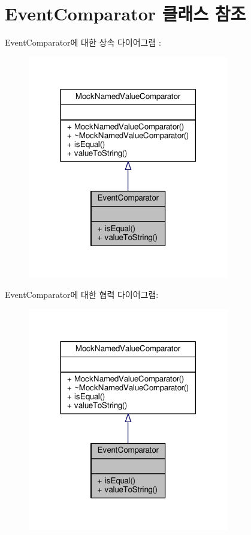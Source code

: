 \hypertarget{class_event_comparator}{}\section{Event\+Comparator 클래스 참조}
\label{class_event_comparator}


Event\+Comparator에 대한 상속 다이어그램 \+: 
\nopagebreak
\begin{figure}[H]
\begin{center}
\leavevmode
\includegraphics[width=249pt]{class_event_comparator__inherit__graph}
\end{center}
\end{figure}


Event\+Comparator에 대한 협력 다이어그램\+:
\nopagebreak
\begin{figure}[H]
\begin{center}
\leavevmode
\includegraphics[width=249pt]{class_event_comparator__coll__graph}
\end{center}
\end{figure}
